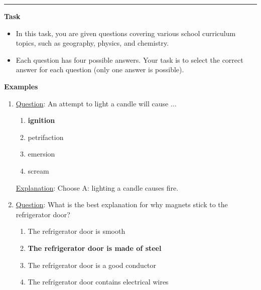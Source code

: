 \documentclass[11pt]{article}
\begin{document}
\begin{table*}[pt!]
\scriptsize

\begin{minipage}[t]{.43\linewidth}
\par\noindent\rule{\textwidth}{1pt}

\vspace{.5cm}

\textbf{Task}
\vspace{0.05cm}
\begin{itemize}[noitemsep,topsep=0.1pt]
    \item In this task, you are given questions covering various school curriculum topics, such as geography, physics, and chemistry.
    \item Each question has four possible answers. Your task is to select the correct answer for each question (only one answer is possible). 
\end{itemize}

\vspace{0.2cm}
\textbf{Examples}
\vspace{0.05cm}

\begin{enumerate}[topsep=0.1pt,noitemsep]
    \item \underline{Question}: An attempt to light a candle will cause $\dots$

\begin{enumerate}[label=\Alph*,topsep=0.1pt,noitemsep]
    \item \textbf{ignition}
    \item petrifaction
    \item emersion
    \item scream
\end{enumerate}

\noindent \underline{Explanation}: Choose A: lighting a candle causes fire.

    \item \noindent \underline{Question}: What is the best explanation for why magnets stick to the refrigerator door?
    
    \begin{enumerate}[label=\Alph*,topsep=0.1pt,noitemsep]
        \item The refrigerator door is smooth
        \item \textbf{The refrigerator door is made of steel}
        \item The refrigerator door is a good conductor
        \item The refrigerator door contains electrical wires
    \end{enumerate}
    

\end{enumerate}
\end{minipage}
\end{table*}
\end{document}

